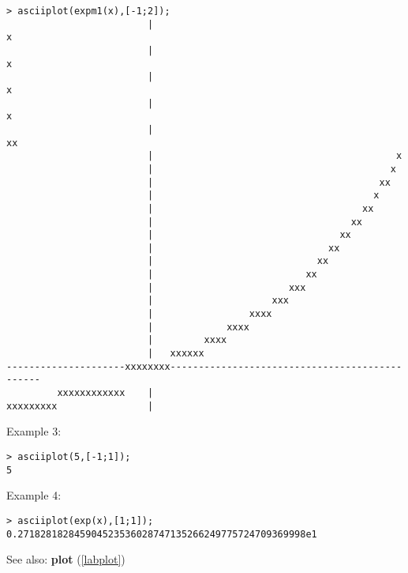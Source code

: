 \begin{center}\begin{minipage}{15cm}\begin{Verbatim}[frame=single]
> asciiplot(expm1(x),[-1;2]);
                         |                                                 x
                         |                                                x 
                         |                                               x  
                         |                                              x   
                         |                                            xx    
                         |                                           x      
                         |                                          x       
                         |                                        xx        
                         |                                       x          
                         |                                     xx           
                         |                                   xx             
                         |                                 xx               
                         |                               xx                 
                         |                             xx                   
                         |                           xx                     
                         |                        xxx                       
                         |                     xxx                          
                         |                 xxxx                             
                         |             xxxx                                 
                         |         xxxx                                     
                         |   xxxxxx                                         
---------------------xxxxxxxx-----------------------------------------------
         xxxxxxxxxxxx    |                                                  
xxxxxxxxx                |                                                  
\end{Verbatim}
\end{minipage}\end{center}
\noindent Example 3: 
\begin{center}\begin{minipage}{15cm}\begin{Verbatim}[frame=single]
> asciiplot(5,[-1;1]);
5
\end{Verbatim}
\end{minipage}\end{center}
\noindent Example 4: 
\begin{center}\begin{minipage}{15cm}\begin{Verbatim}[frame=single]
> asciiplot(exp(x),[1;1]);
0.271828182845904523536028747135266249775724709369998e1
\end{Verbatim}
\end{minipage}\end{center}
See also: \textbf{plot} (\ref{labplot})
